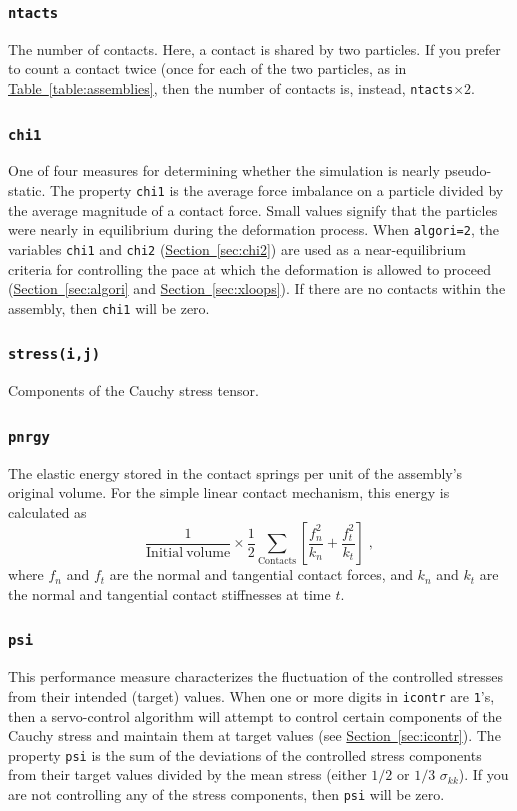 \documentclass[letterpaper,11pt]{article}
\begin{document}
\subsubsection{\texttt{ntacts}}
The number of contacts.  Here, a contact is shared by two particles.  If you
prefer to count a contact twice (once for each of the two particles,
as in 
\hyperref[table:assemblies]{Table~\ref*{table:assemblies}}, then
the number of contacts is, instead, \texttt{ntacts}$\times2$.
%
\subsubsection{\texttt{chi1}}\label{sec:chi1}
One of four measures for determining whether the simulation is nearly
pseudo-static.
The property \texttt{chi1} is the average force imbalance on a particle
divided by the average magnitude of a contact force.
Small values signify that the particles were nearly in equilibrium 
during the deformation process.
When \texttt{algori=2},
the variables \texttt{chi1} and \texttt{chi2}
(\hyperref[sec:chi2]{Section~\ref*{sec:chi2}})
are used as a near-equilibrium criteria
for controlling the pace at which the deformation is allowed to proceed
(\hyperref[sec:algori]{Section~\ref*{sec:algori}}
and \hyperref[sec:xloops]{Section~\ref*{sec:xloops}}).
If there are no contacts within the assembly, then \texttt{chi1} will be zero.
%
\subsubsection{\texttt{stress(i,j)}}
Components of the Cauchy stress tensor.
%
\subsubsection{\texttt{pnrgy}}
The elastic energy stored in the contact springs per unit of the assembly's
original volume.
For the simple linear contact mechanism,
this energy is calculated as
\begin{equation}
\frac{1}{\mathrm{Initial\ volume}}
\times
\frac{1}{2}
\sum_{\text{Contacts}} \left[
\frac{f_{n}^{2}}{k_{n}}
+
\frac{f_{t}^{2}}{k_{t}}
\right]\;,
\end{equation}
where $f_{n}$ and $f_{t}$ are the normal and tangential contact forces,
and $k_{n}$ and $k_{t}$ are the normal and tangential contact
stiffnesses at time $t$.
%
\subsubsection{\texttt{psi}}\label{sec:psi}
This performance measure
characterizes the fluctuation of the controlled stresses from
their intended (target) values. 
When one or more digits in \texttt{icontr} are \texttt{1}'s, then
a servo-control algorithm will attempt
to control certain components of the Cauchy stress 
and maintain them at target values
(see \hyperref[sec:icontr]{Section~\ref*{sec:icontr}}).
The property \texttt{psi} is the sum of the deviations of the controlled
stress components from their
target values divided by the mean stress
(either $1/2$ or $1/3$ $\sigma_{kk}$).
If you are not controlling any of the stress components, then \texttt{psi}
will be zero.
%
\end{document}

